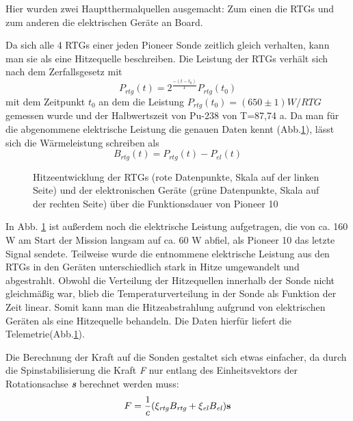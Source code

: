 Hier wurden zwei Hauptthermalquellen ausgemacht: Zum einen die RTGs und
zum anderen die elektrischen Ger\"ate an Board.


\bigskip
Da sich alle 4 RTGs einer jeden Pioneer Sonde zeitlich gleich verhalten,
kann man sie als eine Hitzequelle beschreiben. Die Leistung der RTGs
verh\"alt sich nach dem Zerfallsgesetz mit
\begin{equation}
P_{\mathit{rtg}}(t)=2^{\frac{-(t-t_{0})}{T}}P_{\mathit{rtg}}(t_{0})
\end{equation}
mit dem Zeitpunkt $t_0$ an dem die
Leistung $P_{\mathit{rtg}}(t_{0})=(650\pm 1)W/\mathit{RTG}$ gemessen
wurde und der Halbwertszeit von Pu-238 von T=87,74 a. Da man f\"ur die
abgenommene elektrische Leistung die genauen Daten kennt (Abb.\ref{fig:hitze}),
l\"asst sich die W\"armeleistung schreiben als
\begin{equation}
B_{\mathit{rtg}}(t)=P_{\mathit{rtg}}(t)-P_{\mathit{el}}(t)
\end{equation}


\bigskip

\begin{figure}[htbn]
\begin{center}
\noindent    
{}
\end{center}
\vskip -10pt
  \caption{Hitzeentwicklung der RTGs (rote Datenpunkte, Skala auf der linken Seite) und der elektronischen Geräte (grüne Datenpunkte, Skala auf der rechten Seite) über die Funktionsdauer von Pioneer 10 \cite{Turyshev2010}}
\label{fig:hitze}
\end{figure} 


\bigskip

In Abb. \ref{fig:hitze} ist au{\ss}erdem noch die elektrische Leistung aufgetragen,
die von ca. 160 W am Start der Mission langsam auf ca. 60 W abfiel, als
Pioneer 10 das letzte Signal sendete. Teilweise wurde die entnommene
elektrische Leistung aus den RTGs in den Ger\"aten unterschiedlich stark in Hitze umgewandelt
und abgestrahlt. Obwohl die Verteilung der Hitzequellen innerhalb der
Sonde nicht gleichm\"a{\ss}ig war, blieb die Temperaturverteilung in
der Sonde als Funktion der Zeit linear\cite{Turyshev2010}. Somit kann
man die Hitzeabstrahlung aufgrund von elektrischen Ger\"aten als eine
Hitzequelle behandeln. Die Daten hierf\"ur liefert die Telemetrie(Abb.\ref{fig:hitze}).

Die Berechnung der Kraft auf die Sonden gestaltet sich etwas einfacher,
da durch die Spinstabilisierung die Kraft \textit{F }nur entlang des
Einheitsvektors der Rotationsachse \textit{\bf s} berechnet werden muss:
\begin{equation}
F=\frac{1}{c}(\xi _{\mathit{rtg}}B_{\mathit{rtg}}+\xi
_{\mathit{el}}B_{\mathit{el}}){\bf s}
\end{equation}

